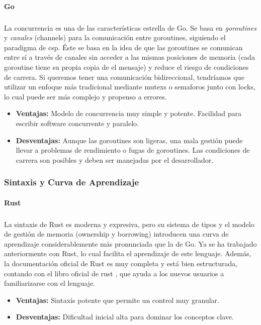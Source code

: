 \paragraph{Go}
\subparagraph{}

La concurrencia es una de las características estrella de Go. Se basa en \textit{goroutines} y \textit{canales} (channels) para la comunicación entre goroutines, siguiendo el paradigma de \acrfull{csp}.
Éste se basa en la idea de que las goroutines se comunican entre sí a través de canales sin acceder a las mismas posiciones de memoria (cada goroutine tiene su propia copia de el mensaje) y reduce el riesgo de condiciones de carrera.
Si queremos tener una comunicación bidireccional, tendríamos que utilizar un enfoque más tradicional mediante \glspl{mutex} o \glspl{semaforo} junto con \glspl{lock}, lo cual puede ser más complejo y propenso a errores.
\begin{itemize}
    \item \textbf{Ventajas:} Modelo de concurrencia muy simple y potente. Facilidad para escribir software concurrente y paralelo.
    \item \textbf{Desventajas:} Aunque las goroutines son ligeras, una mala gestión puede llevar a problemas de rendimiento o fugas de goroutines. Las condiciones de carrera son posibles y deben ser manejadas por el desarrollador.
\end{itemize}

\subsubsection{Sintaxis y Curva de Aprendizaje}
\paragraph{Rust}
\subparagraph{}
La sintaxis de Rust es moderna y expresiva, pero su sistema de tipos y el modelo de gestión de memoria (ownership y borrowing) introducen una curva de aprendizaje considerablemente más pronunciada que la de Go.
Ya se ha trabajado anteriormente con Rust, lo cual facilita el aprendizaje de este lenguaje.
Además, la documentación oficial de Rust es muy completa y está bien estructurada, contando con el libro oficial de rust \parencite{rustbook2024}, que ayuda a los nuevos usuarios a familiarizarse con el lenguaje.
\begin{itemize}
    \item \textbf{Ventajas:} Sintaxis potente que permite un control muy granular.
    \item \textbf{Desventajas:} Dificultad inicial alta para dominar los conceptos clave.
\end{itemize}

